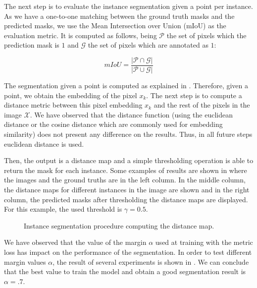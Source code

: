 The next step is to evaluate the instance segmentation given a point per instance.
As we have a one-to-one matching between the ground truth masks and the predicted masks, we use the Mean Intersection over Union (mIoU) as the evaluation metric.
It is computed as follows, being $\mathcal{P}$ the set of pixels which the prediction mask is $1$ and $\mathcal{G}$ the set of pixels which are annotated as $1$:

\begin{equation}
  mIoU = \frac{|\mathcal{P} \cap \mathcal{G}|}{|\mathcal{P} \cup \mathcal{G}|}
\end{equation}

The segmentation given a point is computed as explained in .
Therefore, given a point, we obtain the embedding of the pixel $x_k$.
The next step is to compute a distance metric between this pixel embedding $x_k$ and the rest of the pixels in the image $\mathcal{X}$.
We have observed that the distance function (using the euclidean distance or the cosine distance which are commonly used for embedding similarity) does not present any difference on the results.
Thus, in all future steps euclidean distance is used.

Then, the output is a distance map and a simple thresholding operation is able to return the mask for each instance.
Some examples of results are shown in  where the images and the ground truths are in the left column.
In the middle column, the distance maps for different instances in the image are shown and in the right column, the predicted masks after thresholding the distance maps are displayed.
For this example, the used threshold is $\gamma = 0.5$.

\begin{figure}[h]
  \centering
  \caption{Instance segmentation procedure computing the distance map.}
  \label{fig:experiments:segmentation:distancemaps}
\end{figure}

We have observed that the value of the margin $\alpha$ used at training with the metric loss has impact on the performance of the segmentation.
In order to test different margin values $\alpha$, the result of several experiments is shown in .
We can conclude that the best value to train the model and obtain a good segmentation result is $\alpha = .7$.

